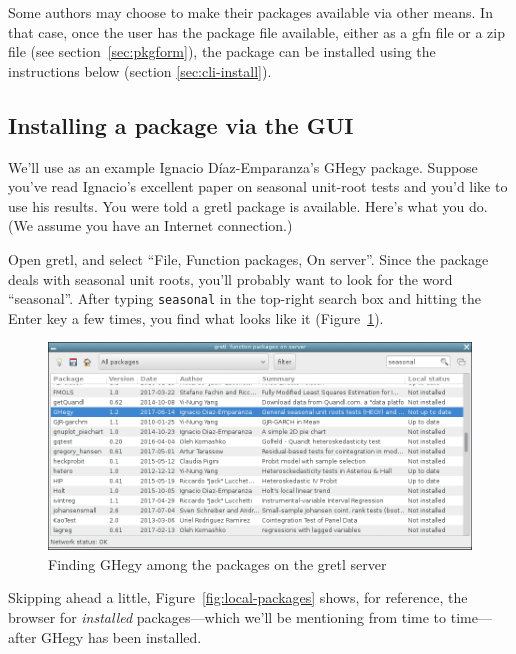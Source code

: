 \documentclass[oneside]{book}
\begin{document}
Some authors may choose to make their packages available via other
means. In that case, once the user has the package file available,
either as a \textsf{gfn} file or a \textsf{zip} file (see
section~\ref{sec:pkgform}), the package can be installed using
the instructions below (section \ref{sec:cli-install}).

\subsection{Installing a package via the GUI}
\label{sec:gui-install}

We'll use as an example Ignacio D\'iaz-Emparanza's \textsf{GHegy}
package.  Suppose you've read Ignacio's excellent paper on seasonal
unit-root tests \citep{Ignacio-HEGY} and you'd like to use his
results. You were told a gretl package is available. Here's what you
do. (We assume you have an Internet connection.)

Open gretl, and select ``File, Function packages, On server''. Since
the package deals with seasonal unit roots, you'll probably want to
look for the word ``seasonal''. After typing \texttt{seasonal} in the
top-right search box and hitting the \textsf{Enter} key a few times,
you find what looks like it (Figure~\ref{fig:ghegy-lst}).

\begin{figure}[htbp]
\begin{center}
  \includegraphics[scale=0.5]{figures/ghegy-lst.png}
\end{center}
\caption{Finding GHegy among the packages on the gretl server}
\label{fig:ghegy-lst}
\end{figure}

Skipping ahead a little, Figure~\ref{fig:local-packages} shows, for
reference, the browser for \textit{installed} packages---which we'll
be mentioning from time to time---after \textsf{GHegy} has been
installed.
\end{document}
